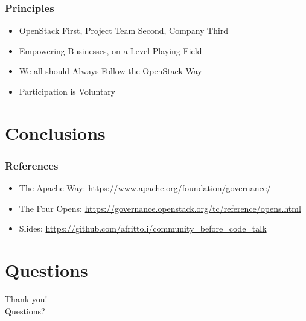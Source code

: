\documentclass[aspectratio=169,11pt,hyperref={colorlinks=true}]{beamer}
\begin{document}
\begin{frame}
  \frametitle{Principles}
    \begin{itemize}
        \item{OpenStack First, Project Team Second, Company Third}
        \item{Empowering Businesses, on a Level Playing Field}
        \item{We all should Always Follow the OpenStack Way}
        \item{Participation is Voluntary}
    \end{itemize}
\end{frame}

\section{Conclusions}

\begin{frame}
  \frametitle{References}
  \begin{itemize}
      \item{The Apache Way: \href{https://www.apache.org/foundation/governance/}{https://www.apache.org/foundation/governance/}}
      \item{The Four Opens: \href{https://governance.openstack.org/tc/reference/opens.html}{https://governance.openstack.org/tc/reference/opens.html}}
      \item{Slides: \href{https://github.com/afrittoli/community\_before\_code\_talk}{https://github.com/afrittoli/community\_before\_code\_talk}}
  \end{itemize}
\end{frame}

\section{Questions}
\begin{frame}[c]
    \begin{center}
        \Huge Thank you!\\Questions?
    \end{center}
\end{frame}
\end{document}
